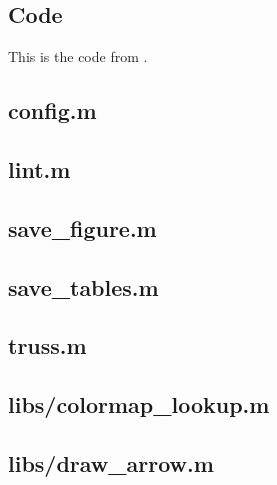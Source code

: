 \documentclass{article}
\begin{document}
\begin{appendices}

\section{Code}

This is the code from \cite{shannon2016}.

\subsection{config.m}\label{app:config.m}


\subsection{lint.m}\label{app:lint.m}


\subsection{save\_figure.m}\label{app:save_figure.m}


\subsection{save\_tables.m}\label{app:save_tables.m}


\subsection{truss.m}\label{app:truss.m}


\subsection{libs/colormap\_lookup.m}\label{app:libs/colormap_lookup.m}


\subsection{libs/draw\_arrow.m}\label{app:libs/draw_arrow.m}



\end{appendices}
\end{document}
